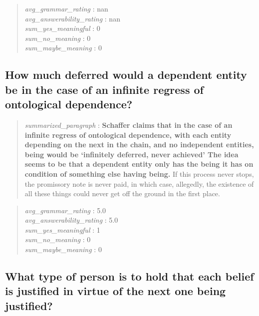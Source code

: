 \begin{quote}
\emph{avg\_grammar\_rating} : nan\\
\emph{avg\_answerability\_rating} : nan\\
\emph{sum\_yes\_meaningful} : 0\\
\emph{sum\_no\_meaning} : 0\\
\emph{sum\_maybe\_meaning} : 0
\end{quote}

\hypertarget{how-much-deferred-would-a-dependent-entity-be-in-the-case-of-an-infinite-regress-of-ontological-dependence}{%
\subsection{How much deferred would a dependent entity be in the case of
an infinite regress of ontological
dependence?}\label{how-much-deferred-would-a-dependent-entity-be-in-the-case-of-an-infinite-regress-of-ontological-dependence}}

\begin{quote}
\emph{summarized\_paragraph} : \textbf{Schaffer claims that in the case
of an infinite regress of ontological dependence, with each entity
depending on the next in the chain, and no independent entities, being
would be `infinitely deferred, never achieved' The idea seems to be that
a dependent entity only has the being it has on condition of something
else having being.} If this process never stops, the promissory note is
never paid, in which case, allegedly, the existence of all these things
could never get off the ground in the first place.
\end{quote}

\begin{quote}
\emph{avg\_grammar\_rating} : 5.0\\
\emph{avg\_answerability\_rating} : 5.0\\
\emph{sum\_yes\_meaningful} : 1\\
\emph{sum\_no\_meaning} : 0\\
\emph{sum\_maybe\_meaning} : 0
\end{quote}

\hypertarget{what-type-of-person-is-to-hold-that-each-belief-is-justified-in-virtue-of-the-next-one-being-justified}{%
\subsection{What type of person is to hold that each belief is justified
in virtue of the next one being
justified?}\label{what-type-of-person-is-to-hold-that-each-belief-is-justified-in-virtue-of-the-next-one-being-justified}}

